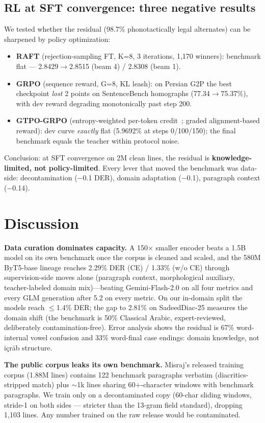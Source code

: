 \documentclass[11pt]{article}
\begin{document}
\subsection{RL at SFT convergence: three negative results}
We tested whether the residual (98.7\% phonotactically legal
alternates) can be sharpened by policy optimization:
\begin{itemize}
  \item \textbf{RAFT} (rejection-sampling FT, K=8, 3 iterations,
        1{,}170 winners): benchmark flat --- 2.8429$\to$2.8515
        (beam 4) / 2.8308 (beam 1).
  \item \textbf{GRPO} (sequence reward, G=8, KL leash): on Persian
        G2P the best checkpoint \emph{lost} 2 points on SentenceBench
        homographs (77.34$\to$75.37\%), with dev reward degrading
        monotonically past step 200.
  \item \textbf{GTPO-GRPO} (entropy-weighted per-token
        credit~\cite{gtpo}; graded alignment-based reward): dev curve
        \emph{exactly} flat (5.9692\% at steps 0/100/150); the final
        benchmark equals the teacher within protocol noise.
\end{itemize}
Conclusion: at SFT convergence on 2M clean lines, the residual is
\textbf{knowledge-limited, not policy-limited}. Every lever that moved
the benchmark was data-side: decontamination ($-$0.1 DER), domain
adaptation ($-$0.1), paragraph context ($-$0.14).

\section{Discussion}
\textbf{Data curation dominates capacity.} A 150$\times$ smaller encoder
beats a 1.5B model on its own benchmark once the corpus is cleaned and
scaled, and the 580M ByT5-base lineage reaches 2.29\% DER (CE) / 1.33\%
(w/o CE) through supervision-side moves alone (paragraph context,
morphological auxiliary, teacher-labeled domain mix)---beating
Gemini-Flash-2.0 on all four metrics and every GLM generation after
5.2 on every metric. On our in-domain
split the models reach $\leq$1.4\% DER; the gap to 2.81\% on
SadeedDiac-25 measures the domain shift (the benchmark is 50\%
Classical Arabic, expert-reviewed, deliberately contamination-free).
Error analysis shows the residual is 67\% word-internal vowel
confusion and 33\% word-final case endings: domain knowledge, not
i{\c{c}}r{\=a}b structure.

\textbf{The public corpus leaks its own benchmark.} Misraj's released
training corpus (1.88M lines) contains 122 benchmark paragraphs
verbatim (diacritics-stripped match) plus ${\sim}$1k lines sharing
60+-character windows with benchmark paragraphs. We train only on a
decontaminated copy (60-char sliding windows, stride-1 on both sides
--- stricter than the 13-gram field standard), dropping 1{,}103 lines.
Any number trained on the raw release would be contaminated.
\end{document}
